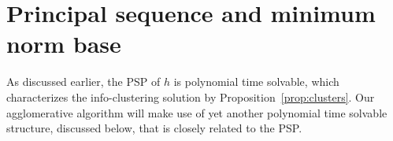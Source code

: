 \section{Principal sequence and minimum norm base}
\label{sec:prelim}
%


As discussed earlier, the PSP of $h$ is polynomial time solvable, which
characterizes the info-clustering solution by Proposition~\ref{prop:clusters}.
Our agglomerative algorithm
will make use of yet another polynomial time solvable structure, discussed below,
that is closely related to the PSP.


